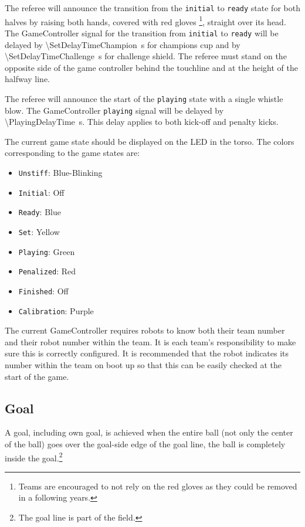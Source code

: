 The referee will announce the transition from the \texttt{initial} to \texttt{ready} state for both halves by raising both hands, covered with red gloves \footnote{Teams are encouraged to not rely on the red gloves as they could be removed in a following years.}, straight over its head.
The GameController signal for the transition from \texttt{initial} to \texttt{ready} will be delayed by \qty{\SetDelayTimeChampion}{\second} for champions cup and by \qty{\SetDelayTimeChallenge}{\second} for challenge shield. 
The referee must stand on the opposite side of the game controller behind the touchline and at the height of the halfway line. 

The referee will announce the start of the \texttt{playing} state with a single whistle blow.
The GameController \texttt{playing} signal will be delayed by \qty{\PlayingDelayTime}{\second}.
This delay applies to both kick-off and penalty kicks.

The current game state should be displayed on the LED in the torso.
The colors corresponding to the game states are:
\begin{itemize}
  \item \texttt{Unstiff}: Blue-Blinking
  \item \texttt{Initial}: Off
  \item \texttt{Ready}: Blue
  \item \texttt{Set}: Yellow
  \item \texttt{Playing}: Green
  \item \texttt{Penalized}: Red
  \item \texttt{Finished}: Off
  \item \texttt{Calibration}: Purple
\end{itemize}

The current GameController requires robots to know both their team number and their robot number within the team.
It is each team's responsibility to make sure this is correctly configured.
It is recommended that the robot indicates its number within the team on boot up so that this can be easily checked at the start of the game.

\subsection{Goal}
\label{sec:goal}

A goal, including own goal, is achieved when the entire ball (not only the center of the ball) goes over the goal-side edge of the goal line, \ie the ball is completely inside the goal.\footnote{
  The goal line is part of the field.
}

